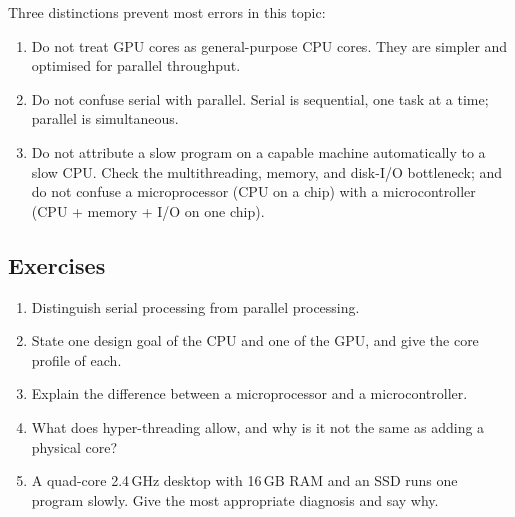 Three distinctions prevent most errors in this topic:
\begin{enumerate}
  \item Do not treat GPU cores as general-purpose CPU cores. They are simpler
    and optimised for parallel throughput.
  \item Do not confuse serial with parallel. Serial is sequential, one task at
    a time; parallel is simultaneous.
  \item Do not attribute a slow program on a capable machine automatically to
    a slow CPU. Check the multithreading, memory, and disk-I/O bottleneck; and
    do not confuse a microprocessor (CPU on a chip) with a microcontroller
    (CPU + memory + I/O on one chip).
\end{enumerate}

\subsection*{Exercises}
\begin{enumerate}[label=\arabic*.]
  \item Distinguish serial processing from parallel processing.
  \item State one design goal of the CPU and one of the GPU, and give the
    core profile of each.
  \item Explain the difference between a microprocessor and a microcontroller.
  \item What does hyper-threading allow, and why is it not the same as adding
    a physical core?
  \item A quad-core 2.4\,GHz desktop with 16\,GB RAM and an SSD runs one
    program slowly. Give the most appropriate diagnosis and say why.
\end{enumerate}

